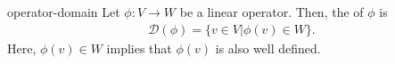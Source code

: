 \begin{Definition}{operator-domain}
  Let $\phi: V\to W$ be a linear operator. Then, the 
  of $\phi$ is
  \begin{gather*}
    \mathcal D(\phi) = \bigl\{ v\in V \big|
    \phi(v) \in W \bigr\}.
  \end{gather*}
  Here, $\phi(v) \in W$ implies that $\phi(v)$ is also well defined.
\end{Definition}




